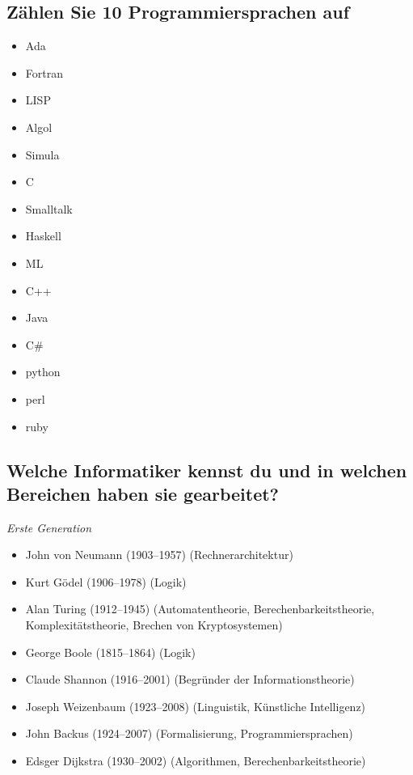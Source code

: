 \subsection{Zählen Sie 10 Programmiersprachen auf}

\begin{itemize}
  \item Ada
  \item Fortran
  \item LISP
  \item Algol
  \item Simula
  \item C
  \item Smalltalk
  \item Haskell
  \item ML
  \item C++
  \item Java
  \item C\#
  \item python
  \item perl
  \item ruby
\end{itemize}

\subsection{Welche Informatiker kennst du und in welchen Bereichen
    haben sie gearbeitet?}

\emph{Erste Generation}

\begin{itemize}
  \item John von Neumann (1903--1957) (Rechnerarchitektur)
  \item Kurt Gödel (1906--1978) (Logik)
  \item Alan Turing (1912--1945) (Automatentheorie, Berechenbarkeitstheorie,
    Komplexitätstheorie, Brechen von Kryptosystemen)
  \item George Boole (1815--1864) (Logik)
  \item Claude Shannon (1916--2001) (Begründer der Informationstheorie)
  \item Joseph Weizenbaum (1923--2008) (Linguistik, Künstliche Intelligenz)
  \item John Backus (1924--2007) (Formalisierung, Programmiersprachen)
  \item Edsger Dijkstra (1930--2002) (Algorithmen, Berechenbarkeitstheorie)
\end{itemize}

